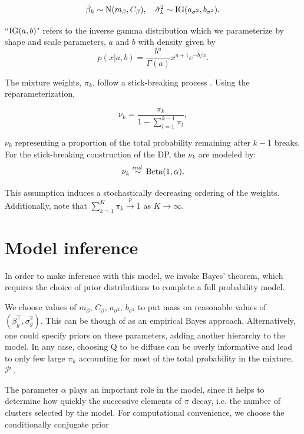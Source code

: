 \begin{equation}
\tilde{\beta}_k \sim \operatorname{N}(m_\beta, C_\beta),\quad \tilde{\sigma}^2_k \sim \operatorname{IG}(a_{\sigma^2}, b_{\sigma^2}).
\end{equation}

``$\operatorname{IG}(a,b)$" refers to the inverse gamma distribution which we parameterize by shape and scale parameters, $a$ and $b$ with density given by
\begin{equation*}
p(x|a,b) = \frac{b^a}{\Gamma(a)}x^{a+1}e^{-b/x}.
\end{equation*}


The mixture weights, $\pi_k$,  follow a stick-breaking process \cite{sethuraman}. Using the reparameterization,

\begin{equation}
\nu_k = \frac{\pi_k}{1 - \sum_{l=1}^{k-1} \pi_l},
\end{equation}

$\nu_k$ representing a proportion of the total probability remaining after $k-1$ breaks. For the stick-breaking construction of the DP, the $\nu_k$ are modeled by:
\begin{equation}
\nu_k \stackrel{ind.}{\sim} \operatorname{Beta}(1, \alpha).
\end{equation}

This assumption induces a stochastically decreasing ordering of the weights. Additionally, note that $\sum_{k=1}^K \pi_k \stackrel{p}{\rightarrow} 1$ as $K\rightarrow \infty$. 



\section{Model inference}
\label{sec:inference}
In order to make inference with this model, we invoke Bayes' theorem, which requires the choice of prior distributions to complete a full probability model.

We choose values of $m_\beta,\,C_\beta,\,a_{\sigma^2},\,b_{\sigma^2}$ to put mass on reasonable values of $\left(\beta_g^\top,\sigma^2_g\right)$. This can be though of as an empirical Bayes approach. Alternatively, one could specify priors on these parameters, adding another hierarchy to the model. In any case, choosing Q to be diffuse can be overly informative and lead to only few large $\pi_k$ accounting for most of the total probability in the mixture, $\mathcal{P}$ \citep{gelman-book}.

The parameter $\alpha$ plays an important role in the model, since it helps to determine how quickly the successive elements of $\pi$ decay, i.e. the number of clusters selected by the model. For computational convenience, we choose the conditionally conjugate prior

